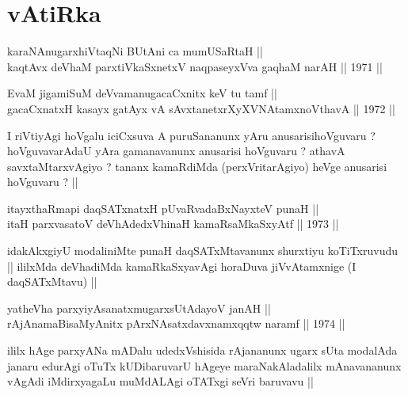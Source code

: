 \section*{vAtiRka}

\begin{shl}
karaNAnugarxhiVtaqNi BUtAni ca mumUSaRtaH || \\
kaqtAvx deVhaM parxtiVkaSxnetxV naqpaseyxVva gaqhaM narAH ||  1971 ||  
\end{shl}



\begin{shl}
EvaM jigamiSuM deVvamanugacaCxnitx keV tu tamf || \\
gacaCxnatxH kasayx gatAyx vA sAvxtanetxrXyXVNA\s \s tamxnoV\s thavA ||  1972 ||  
\end{shl}

\begin{artha}
I riVtiyAgi hoVgalu iciCxsuva A puruSananunx yAru anusarisihoVguvaru ?
hoVguvavarAdaU yAra gamanavanunx anusarisi hoVguvaru ? athavA
savxtaMtarxvAgiyo ? tananx kamaRdiMda (perxVritarAgiyo) heVge
anusarisi hoVguvaru ? ||
\end{artha}

\begin{shl}
itayxthaRmapi daqSATxnatxH pUvaRvadaBxNayxteV punaH || \\
itaH parxvasatoV deVhAdedxVhinaH kamaRsaMkaSxyAtf ||  1973 ||  
\end{shl}

\begin{artha}
idakAkxgiyU modaliniMte punaH daqSATxMtavanunx shurxtiyu koTiTxruvudu
|| ililxMda deVhadiMda kamaRkaSxyavAgi horaDuva jiVvAtamxnige (I
daqSATxMtavu) ||
\end{artha}


\begin{shl}
yatheVha parxyiyAsanatxmugarxsUtAdayoV janAH || \\
rAjAnamaBisaMyAnitx pArxNAsatxdavxnamxqqtw naramf ||  1974 ||  
\end{shl}

\begin{artha}
ililx hAge parxyANa mADalu udedxVshisida rAjananunx ugarx sUta
modalAda janaru edurAgi oTuTx kUDibaruvarU hAgeye maraNakAladalilx
mAnavananunx vAgAdi iMdirxyagaLu muMdALAgi oTATxgi seVri baruvavu ||
\end{artha}

